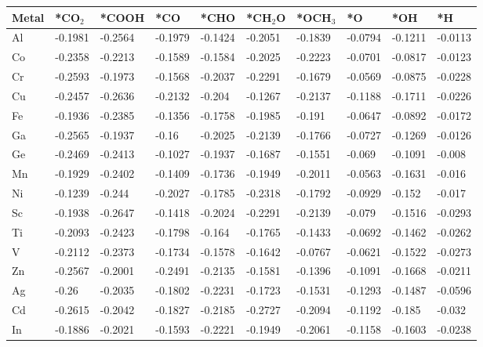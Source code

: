 \begin{table}[h]
  \centering
  {\fontsize{6}{12}\selectfont
  \begin{tabular}{*{10}{l}}
      \hline
      Metal & *CO$_2$ & *COOH& *CO     & *CHO    & *CH$_2$O& *OCH$_3$& *O      & *OH     & *H      \\
      \hline
      Al & -0.1981 & -0.2564 & -0.1979 & -0.1424 & -0.2051 & -0.1839 & -0.0794 & -0.1211 & -0.0113 \\
      Co & -0.2358 & -0.2213 & -0.1589 & -0.1584 & -0.2025 & -0.2223 & -0.0701 & -0.0817 & -0.0123 \\
      Cr & -0.2593 & -0.1973 & -0.1568 & -0.2037 & -0.2291 & -0.1679 & -0.0569 & -0.0875 & -0.0228 \\
      Cu & -0.2457 & -0.2636 & -0.2132 & -0.204  & -0.1267 & -0.2137 & -0.1188 & -0.1711 & -0.0226 \\
      Fe & -0.1936 & -0.2385 & -0.1356 & -0.1758 & -0.1985 & -0.191  & -0.0647 & -0.0892 & -0.0172 \\
      Ga & -0.2565 & -0.1937 & -0.16   & -0.2025 & -0.2139 & -0.1766 & -0.0727 & -0.1269 & -0.0126 \\
      Ge & -0.2469 & -0.2413 & -0.1027 & -0.1937 & -0.1687 & -0.1551 & -0.069  & -0.1091 & -0.008  \\
      Mn & -0.1929 & -0.2402 & -0.1409 & -0.1736 & -0.1949 & -0.2011 & -0.0563 & -0.1631 & -0.016  \\
      Ni & -0.1239 & -0.244  & -0.2027 & -0.1785 & -0.2318 & -0.1792 & -0.0929 & -0.152  & -0.017  \\
      Sc & -0.1938 & -0.2647 & -0.1418 & -0.2024 & -0.2291 & -0.2139 & -0.079  & -0.1516 & -0.0293 \\
      Ti & -0.2093 & -0.2423 & -0.1798 & -0.164  & -0.1765 & -0.1433 & -0.0692 & -0.1462 & -0.0262 \\
      V  & -0.2112 & -0.2373 & -0.1734 & -0.1578 & -0.1642 & -0.0767 & -0.0621 & -0.1522 & -0.0273 \\
      Zn & -0.2567 & -0.2001 & -0.2491 & -0.2135 & -0.1581 & -0.1396 & -0.1091 & -0.1668 & -0.0211 \\
      Ag & -0.26   & -0.2035 & -0.1802 & -0.2231 & -0.1723 & -0.1531 & -0.1293 & -0.1487 & -0.0596 \\
      Cd & -0.2615 & -0.2042 & -0.1827 & -0.2185 & -0.2727 & -0.2094 & -0.1192 & -0.185  & -0.032  \\
      In & -0.1886 & -0.2021 & -0.1593 & -0.2221 & -0.1949 & -0.2061 & -0.1158 & -0.1603 & -0.0238 \\

\end{tabular}}
\end{table}
